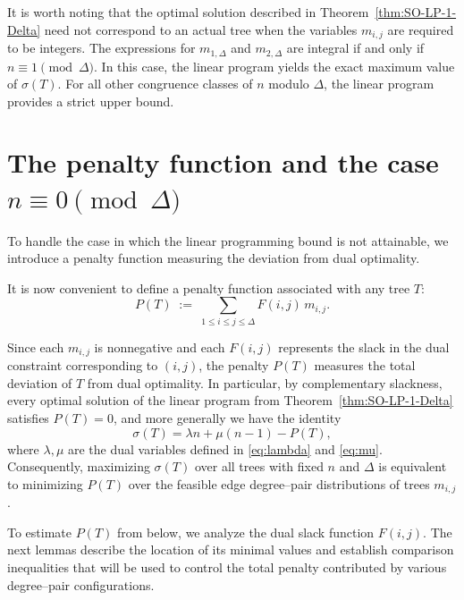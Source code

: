 \documentclass[preprint,12pt]{elsarticle}
\begin{document}
It is worth noting that the optimal solution described in
Theorem~\ref{thm:SO-LP-1-Delta} need not correspond to an actual tree when the
variables $m_{i,j}$ are required to be integers.
The expressions for $m_{1,\Delta}$ and $m_{2,\Delta}$ are integral if and only if
$n\equiv1\pmod{\Delta}$.
In this case, the linear program yields the exact maximum value of $\sigma(T)$.
For all other congruence classes of $n$ modulo $\Delta$, the linear program
provides a strict upper bound.


\bigskip




\section{The penalty function and the case $n \equiv 0 \pmod \Delta$} 


To handle the case in which the linear programming bound is not attainable,
we introduce a penalty function measuring the deviation from dual optimality.


\medskip

It is now convenient to define a penalty function associated with any tree $T$:
\begin{equation}
\label{def:P(T)}
P(T) \;:=\; \sum_{1\le i\le j\le \Delta} F(i,j)\, m_{i,j}.
\end{equation}

Since each $m_{i,j}$ is nonnegative and each $F(i,j)$ represents the slack in the dual constraint corresponding to $(i,j)$, the penalty $P(T)$ measures the total deviation of $T$ from dual optimality. In particular, by complementary slackness, every optimal solution of the linear program from Theorem~\ref{thm:SO-LP-1-Delta} satisfies $P(T) = 0$, and more generally we have the identity
\[
\sigma(T) = \lambda n + \mu(n{-}1) - P(T),
\]
where $\lambda,\mu$ are the dual variables defined in \eqref{eq:lambda} and \eqref{eq:mu}.
Consequently, maximizing $\sigma(T)$ over all trees with fixed $n$ and $\Delta$
is equivalent to minimizing $P(T)$ over the feasible edge degree--pair distributions
of trees $m_{i,j}$.

\medskip

To estimate $P(T)$ from below, we analyze the dual slack
function $F(i,j)$. The next lemmas describe the location of its minimal values
and establish comparison inequalities that will be used to control the total
penalty contributed by various degree--pair configurations.
\end{document}
